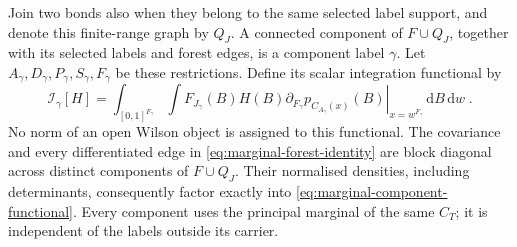\documentclass[11pt]{article}
\newcommand{\dd}{\mathrm{d}}
\begin{document}
Join two bonds also when they belong to the same selected label support, and denote this finite-range graph by $Q_J$. A connected component of $F\cup Q_J$, together with its selected labels and forest edges, is a component label $\gamma$. Let $A_\gamma,D_\gamma,P_\gamma,S_\gamma,F_\gamma$ be these restrictions. Define its scalar integration functional by
\begin{equation}\label{eq:marginal-component-functional}
    \mathcal I_\gamma[H]
        =\int_{[0,1]^{F_\gamma}}\int
            F_{J_\gamma}(B)H(B)
            \left.\partial_{F_\gamma}p_{C_{A_\gamma}(x)}(B)
            \right|_{x=w^{F_\gamma}}
                \,\dd B\,\dd w\;.
\end{equation}
No norm of an open Wilson object is assigned to this functional. The covariance and every differentiated edge in \eqref{eq:marginal-forest-identity} are block diagonal across distinct components of $F\cup Q_J$. Their normalised densities, including determinants, consequently factor exactly into \eqref{eq:marginal-component-functional}. Every component uses the principal marginal of the same $C_T$; it is independent of the labels outside its carrier.
\end{document}
